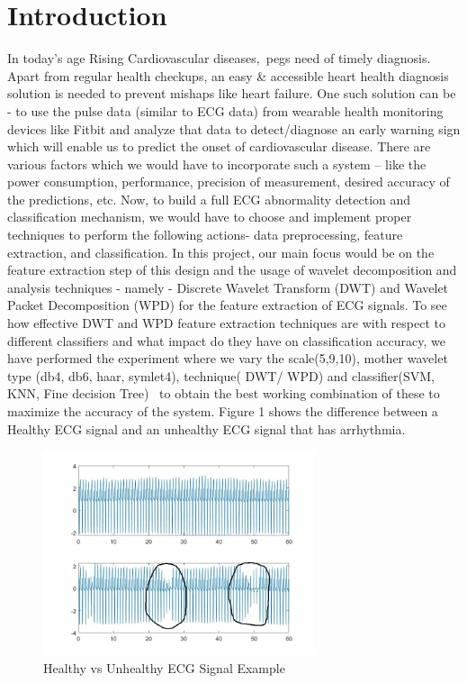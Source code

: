 \documentclass[10pt,twocolumn,letterpaper]{article}
\begin{document}
\section{Introduction}
\label{sec:intro}
In today’s age Rising Cardiovascular diseases, pegs need of timely diagnosis. Apart from regular health checkups, an easy \& accessible heart health diagnosis solution is needed to prevent mishaps like heart failure. One such solution can be - to use the pulse data (similar to ECG data) from wearable health monitoring devices like Fitbit and analyze that data to detect/diagnose an early warning sign which will enable us to predict the onset of cardiovascular disease. There are various factors which we would have to incorporate such a system – like the power consumption, performance, precision of measurement, desired accuracy of the predictions, etc.
Now, to build a full ECG abnormality detection and classification mechanism, we would have to choose and implement proper techniques to perform the following actions- data preprocessing, feature extraction, and classification. In this project, our main focus would be on the feature extraction step of this design and the usage of wavelet decomposition and analysis techniques - namely - Discrete Wavelet Transform (DWT) and Wavelet Packet Decomposition (WPD) for the feature extraction of ECG signals.
To see how effective DWT and WPD feature extraction techniques are with respect to different classifiers and what impact do they have on classification accuracy, we have performed the experiment where we vary the scale(5,9,10), mother wavelet type (db4, db6, haar, symlet4), technique( DWT/ WPD) and classifier(SVM, KNN, Fine decision Tree)  to obtain the best working combination of these to maximize the accuracy of the system.
Figure 1 shows the difference between a Healthy ECG signal and an unhealthy ECG signal that has arrhythmia.
\begin{figure}[h!]
\includegraphics[width=8cm]{healthyVSunhealthy.JPG}
\caption{Healthy vs Unhealthy  ECG Signal Example}
\label{Comparison}
\end{figure}
\end{document}
